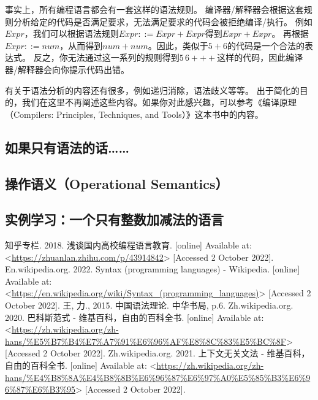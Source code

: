 \documentclass[../main.tex]{subfiles}
\begin{document}
  \indent 事实上，所有编程语言都会有一套这样的语法规则。
  编译器/解释器会根据这套规则分析给定的代码是否满足要求，无法满足要求的代码会被拒绝编译/执行。
  例如$Expr$，我们可以根据语法规则$Expr ::= Expr + Expr$得到$Expr + Expr$。
  再根据$Expr ::= num$，从而得到$num + num$。因此，类似于$5 + 6$的代码是一个合法的表达式。
  反之，你无法通过这一系列的规则得到$5\,6+++$这样的代码，因此编译器/解释器会向你提示代码出错。

  \indent 有关于语法分析的内容还有很多，例如递归消除，语法歧义等等。
  出于简化的目的，我们在这里不再阐述这些内容。如果你对此感兴趣，可以参考《编译原理（Compilers: Principles, Techniques, and Tools）》这本书中的内容。

  \subsection{如果只有语法的话……}

  \subsection{操作语义（Operational Semantics）}

  \subsection{实例学习：一个只有整数加减法的语言}

  \begin{thebibliography}{5}
     知乎专栏. 2018. 浅谈国内高校编程语言教育. [online] Available at: <\url{https://zhuanlan.zhihu.com/p/43914842}> [Accessed 2 October 2022].
     En.wikipedia.org. 2022. Syntax (programming languages) - Wikipedia. [online] Available at: <\url{https://en.wikipedia.org/wiki/Syntax_(programming_languages)}> [Accessed 2 October 2022].
     王, 力., 2015. 中国语法理论. 中华书局, p.6.
     Zh.wikipedia.org. 2020. 巴科斯范式 - 维基百科，自由的百科全书. [online] Available at: <\url{https://zh.wikipedia.org/zh-hans/%E5%B7%B4%E7%A7%91%E6%96%AF%E8%8C%83%E5%BC%8F}> [Accessed 2 October 2022]. 
     Zh.wikipedia.org. 2021. 上下文无关文法 - 维基百科，自由的百科全书. [online] Available at: <\url{https://zh.wikipedia.org/zh-hans/%E4%B8%8A%E4%B8%8B%E6%96%87%E6%97%A0%E5%85%B3%E6%96%87%E6%B3%95}> [Accessed 2 October 2022].
  \end{thebibliography}
\end{document}
